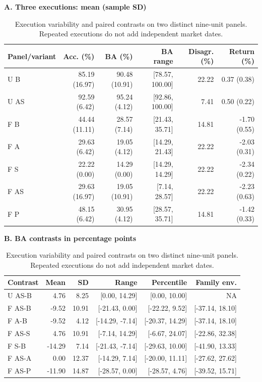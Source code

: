 \begin{table}[!htbp]
\centering\small
\setlength{\tabcolsep}{3pt}
\renewcommand{\arraystretch}{1.15}
\caption{Execution variability and paired contrasts on two distinct nine-unit panels. Repeated executions do not add independent market dates.}
\label{tab:repeats}
\textbf{A. Three executions: mean (sample SD)}\par\smallskip
\begin{tabular}{lrrrrr}
\hline
Panel/variant & Acc. (\%) & BA (\%) & BA range & Disagr. (\%) & Return (\%) \\
\hline
U B & 85.19 (16.97) & 90.48 (10.91) & [78.57, 100.00] & 22.22 & 0.37 (0.38) \\
U AS & 92.59 (6.42) & 95.24 (4.12) & [92.86, 100.00] & 7.41 & 0.50 (0.22) \\
F B & 44.44 (11.11) & 28.57 (7.14) & [21.43, 35.71] & 14.81 & -1.70 (0.55) \\
F A & 29.63 (6.42) & 19.05 (4.12) & [14.29, 21.43] & 22.22 & -2.03 (0.31) \\
F S & 22.22 (0.00) & 14.29 (0.00) & [14.29, 14.29] & 22.22 & -2.34 (0.22) \\
F AS & 29.63 (16.97) & 19.05 (10.91) & [7.14, 28.57] & 22.22 & -2.23 (0.63) \\
F P & 48.15 (6.42) & 30.95 (4.12) & [28.57, 35.71] & 14.81 & -1.42 (0.33) \\
\hline
\end{tabular}\par\medskip
\textbf{B. BA contrasts in percentage points}\par\smallskip
\begin{tabular}{lrrrrr}
\hline
Contrast & Mean & SD & Range & Percentile & Family env. \\
\hline
U AS-B & 4.76 & 8.25 & [0.00, 14.29] & [0.00, 10.00] & NA \\
F AS-B & -9.52 & 10.91 & [-21.43, 0.00] & [-22.22, 9.52] & [-37.14, 18.10] \\
F A-B & -9.52 & 4.12 & [-14.29, -7.14] & [-20.37, 14.29] & [-37.14, 18.10] \\
F AS-S & 4.76 & 10.91 & [-7.14, 14.29] & [-6.67, 24.07] & [-22.86, 32.38] \\
F S-B & -14.29 & 7.14 & [-21.43, -7.14] & [-29.63, 10.00] & [-41.90, 13.33] \\
F AS-A & 0.00 & 12.37 & [-14.29, 7.14] & [-20.00, 11.11] & [-27.62, 27.62] \\
F AS-P & -11.90 & 14.87 & [-28.57, 0.00] & [-28.57, 4.76] & [-39.52, 15.71] \\

\end{tabular}
\end{table}
